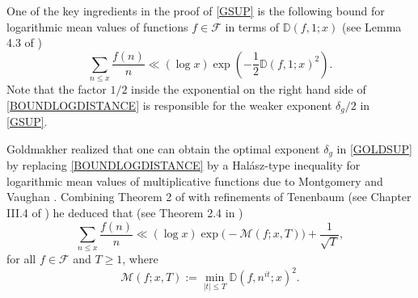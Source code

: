 \documentclass[12pt]{amsart}
\theoremstyle{definition}
\numberwithin{equation}{section}
\newcommand{\mb}{\mathbb}
\newcommand{\mc}{\mathcal}
\begin{document}
One of the key ingredients in the proof of \eqref{GSUP} is the following bound for logarithmic mean values of functions $f\in \mc{F}$ in terms of $\mb{D}(f,1;x)$ (see Lemma 4.3 of \cite{GrSo2}) 
\begin{equation}\label{BOUNDLOGDISTANCE}
\sum_{n\leq x} \frac{f(n)}{n}\ll (\log x) \exp\left(-\frac{1}{2}\mb{D}(f,1;x)^2\right).
\end{equation}
Note that the factor $1/2$ inside the exponential on the right hand side of \eqref{BOUNDLOGDISTANCE} is responsible for the weaker exponent $\delta_g/2$ in \eqref{GSUP}.

Goldmakher \cite{GOLD} realized that one can obtain the optimal exponent $\delta_g$ in \eqref{GOLDSUP} by replacing \eqref{BOUNDLOGDISTANCE} by a Hal\'{a}sz-type inequality for logarithmic mean values of multiplicative functions due to Montgomery and Vaughan \cite{MV}. Combining Theorem 2 of \cite{MV} with refinements of Tenenbaum (see Chapter III.4 of \cite{Te}) he deduced that (see Theorem 2.4 in \cite{GOLD})
\begin{equation} \label{HMTFIRST}
 \sum_{n \leq x} \frac{f(n)}{n} \ll (\log x)\exp\big(-\mc{M}(f;x,T)\big) + \frac{1}{\sqrt{T}},
\end{equation}
for all $f\in \mc{F}$ and $T\geq 1$, where 
$$
\mc{M}(f;x,T) := \min_{|t| \leq T} \mb{D}(f,n^{it};x)^2.
$$
\end{document}
